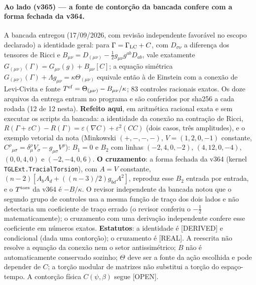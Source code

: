 \documentclass[11pt]{article}
\theoremstyle{definition}\newtheorem{deriv}{Derivação}
\begin{document}
\paragraph*{Ao lado (v365) --- a fonte de contorção da bancada confere com a forma fechada da v364.} A bancada entregou (17/09/2026, com revisão independente favorável no escopo declarado) a identidade geral: para $\Gamma=\Gamma_{\rm LC}+C$, com $D_{\sigma\nu}$ a diferença dos tensores de Ricci e $B_{\mu\nu}=D_{(\mu\nu)}-\tfrac12g_{\mu\nu}g^{ab}D_{ab}$, vale exatamente $G_{(\mu\nu)}(\Gamma)=G_{\mu\nu}(g)+B_{\mu\nu}[C]$; a equação simétrica $G_{(\mu\nu)}(\Gamma)+\Lambda g_{\mu\nu}=\kappa\Theta_{(\mu\nu)}$ equivale então à de Einstein com a conexão de Levi-Civita e fonte $T^{\rm ef}=\Theta_{(\mu\nu)}-B_{\mu\nu}/\kappa$; 83 controles racionais exatos. Os doze arquivos da entrega entram no programa e são conferidos por sha256 a cada rodada (12 de 12 nesta). \textbf{Refeito aqui}, em aritmética racional exata e sem executar os scripts da bancada: a identidade da conexão na contração de Ricci, $R(\Gamma+\varepsilon C)-R(\Gamma)=\varepsilon(\nabla C)+\varepsilon^2(CC)$ (dois casos, três amplitudes), e o exemplo vetorial da nota (Minkowski $(+,-,-,-)$, $V=(1,2,0,-1)$ constante, $C^\rho{}_{\mu\sigma}=\delta^\rho_\mu V_\sigma-g_{\mu\sigma}V^\rho$): $B_1=0$ e $B_2$ com linhas $(-2,4,0,-2)$, $(4,12,0,-4)$, $(0,0,4,0)$ e $(-2,-4,0,6)$. \textbf{O cruzamento}: a forma fechada da v364 (kernel \texttt{TGLExt.TracialTorsion}), com $A=V$ constante, $(n-2)[A_bA_d+((n-3)/2)g_{bd}A^2]$, reproduz esse $B_2$ entrada por entrada, e o $T^{\rm tors}$ da v364 é $-B/\kappa$. O revisor independente da bancada notou que o segundo grupo de controles usa a mesma função de traço dos dois lados e não detectaria um coeficiente de traço errado (o revisor conferiu o $-\tfrac12$ matematicamente); o cruzamento com uma derivação independente confere esse coeficiente em números exatos. \textbf{Estatutos}: a identidade é [DERIVED] e condicional (dada uma contorção); o cruzamento é [REAL]. A reescrita não resolve a equação da conexão nem o setor antissimétrico; $B$ não é automaticamente conservado sozinho; $\Theta$ deve ser a fonte da ação escolhida e pode depender de $C$; a torção modular de matrizes não substitui a torção do espaço-tempo. A contorção física $C(\psi,\beta)$ segue [OPEN].
\end{document}
